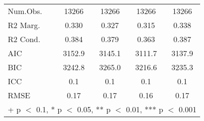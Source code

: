 \begin{table}
\begin{tabular}[t]{lcccc}
\midrule
Num.Obs. & \num{13266} & \num{13266} & \num{13266} & \num{13266}\\
R2 Marg. & \num{0.330} & \num{0.327} & \num{0.315} & \num{0.338}\\
R2 Cond. & \num{0.384} & \num{0.379} & \num{0.363} & \num{0.387}\\
AIC & \num{3152.9} & \num{3145.1} & \num{3111.7} & \num{3137.9}\\
BIC & \num{3242.8} & \num{3265.0} & \num{3216.6} & \num{3235.3}\\
ICC & \num{0.1} & \num{0.1} & \num{0.1} & \num{0.1}\\
RMSE & \num{0.17} & \num{0.17} & \num{0.16} & \num{0.17}\\
\bottomrule
\multicolumn{5}{l}{\rule{0pt}{1em}+ p $<$ 0.1, * p $<$ 0.05, ** p $<$ 0.01, *** p $<$ 0.001}\\
\end{tabular}
\end{table}
